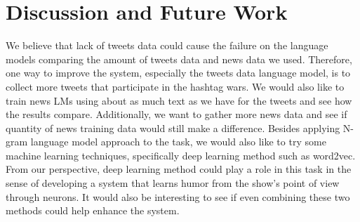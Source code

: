 \documentclass[11pt,a4paper]{article}
\begin{document}
\section{Discussion and Future Work}
We believe that lack of tweets data could cause the failure on the language models comparing the amount of tweets data and news data we used. Therefore, one way to improve the system, especially the tweets data language model, is to collect more tweets that participate in the hashtag wars. We would also like to train news LMs using about as much text as we have for the tweets and see how the results compare. Additionally, we want to gather more news data and see if quantity of news training data would still make a difference. Besides applying N-gram language model approach to the task, we would also like to try some machine learning techniques, specifically deep learning method such as word2vec. From our perspective, deep learning method could play a role in this task in the sense of developing a system that learns humor from the show's point of view through neurons. It would also be interesting to see if even combining these two methods could help enhance the system.




%
%


\end{document}
